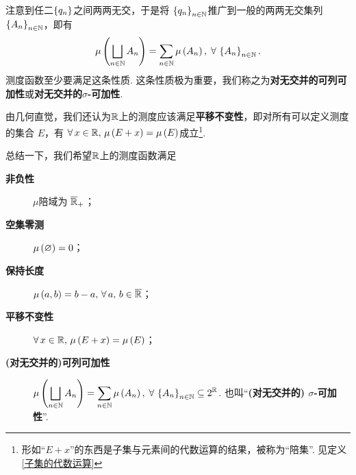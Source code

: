 注意到任二$\left\{q_n\right\}$之间两两无交，于是将 $\left\{ q_n \right\}_{n\in\mathbb{N}}$推广到一般的两两无交集列$\left\{A_n\right\}_{n\in\mathbb{N}}$，即有
\[   \mu\left( \bigsqcup_{n\in\mathbb{N}} A_n \right) = \sum_{n\in\mathbb{N}} \mu\left( A_n \right),\;\forall\,\left\{A_n\right\}_{n\in\mathbb{N}}.   \]
测度函数至少要满足这条性质. 这条性质极为重要，我们称之为\textbf{对无交并的可列可加性}或\textbf{对无交并的$\sigma$-可加性}. 

由几何直觉，我们还认为$\mathbb{R}$上的测度应该满足\textbf{平移不变性}，即对所有可以定义测度的集合 $E$，有 $\forall\,x\in\mathbb{R},\,\mu\left(E+x\right)=\mu\left(E\right)$成立\footnote{形如“$E+x$”的东西是子集与元素间的代数运算的结果，被称为“陪集”. 见定义\ref{子集的代数运算}}.
\vspace{0.5cm}

总结一下，我们希望$\mathbb{R}$上的测度函数满足
\begin{description}
    \item[\textbf{非负性}] $\mu$陪域为 $\overline{\mathbb{R}}_+$；
    \item[\textbf{空集零测}] $\mu\left(\varnothing\right)=0$；
    \item[\textbf{保持长度}] $\mu\z(a,b\y)=b-a,\,\forall\,a,\,b\in\Bar{\R}$；
    \item[\textbf{平移不变性}] $\forall\,x\in\mathbb{R},\,\mu\left(E+x\right)=\mu\left(E\right)$；
    \item[\textbf{(对无交并的)可列可加性}] $\displaystyle \mu\left( \bigsqcup_{n\in\mathbb{N}} A_n \right) = \sum_{n\in\mathbb{N}} \mu\left( A_n \right),\;\forall\,\left\{A_n\right\}_{n\in\mathbb{N}}\subseteq2^{\mathbb{R}}$. 也叫“\textbf{(对无交并的) $\sigma$-可加性}”.
\end{description}
\vspace{0.5cm}

